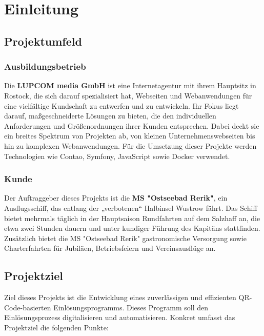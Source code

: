 \section{Einleitung}
\label{sec:Einleitung}


\subsection{Projektumfeld} 
\label{sec:Projektumfeld}

\subsubsection{Ausbildungsbetrieb}

Die \textbf{LUPCOM media GmbH} ist eine Internetagentur mit ihrem Hauptsitz in Rostock, die sich darauf spezialisiert hat, Webseiten und Webanwendungen für eine vielfältige Kundschaft zu entwerfen und zu entwickeln. Ihr Fokus liegt darauf, maßgeschneiderte Lösungen zu bieten, die den individuellen Anforderungen und Größenordnungen ihrer Kunden entsprechen. Dabei deckt sie ein breites Spektrum von Projekten ab, von kleinen Unternehmenswebseiten bis hin zu komplexen Webanwendungen. Für die Umsetzung dieser Projekte werden Technologien wie Contao, Symfony, JavaScript sowie Docker verwendet.

\subsubsection{Kunde}

Der Auftraggeber dieses Projekts ist die \textbf{MS "Ostseebad Rerik"}, ein Ausflugsschiff, das entlang der „verbotenen“ Halbinsel Wustrow fährt. Das Schiff bietet mehrmals täglich in der Hauptsaison Rundfahrten auf dem Salzhaff an, die etwa zwei Stunden dauern und unter kundiger Führung des Kapitäns stattfinden. Zusätzlich bietet die MS "Ostseebad Rerik" gastronomische Versorgung sowie Charterfahrten für Jubiläen, Betriebsfeiern und Vereinsausflüge an.


\subsection{Projektziel} 
\label{sec:Projektziel}

Ziel dieses Projekts ist die Entwicklung eines zuverlässigen und effizienten QR-Code-basierten Einlösungsprogramms. Dieses Programm soll den Einlösungsprozess digitalisieren und automatisieren. Konkret umfasst das Projektziel die folgenden Punkte:

